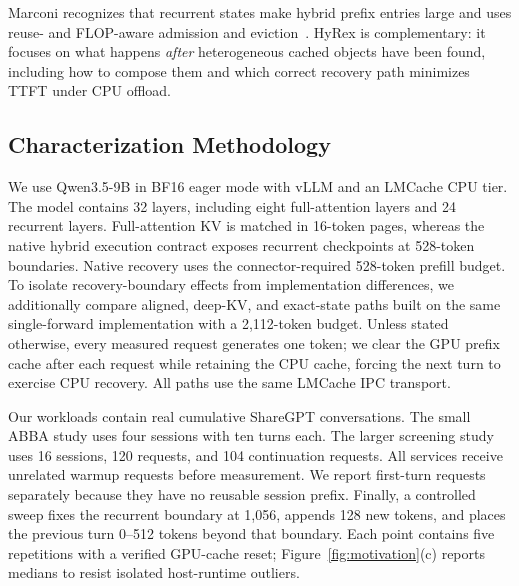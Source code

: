 \documentclass[sigconf,anonymous,review]{acmart}
\begin{document}
Marconi recognizes that recurrent states make hybrid prefix entries large and
uses reuse- and FLOP-aware admission and eviction~\cite{pan2025marconi}.  HyRex
is complementary: it focuses on what happens \emph{after} heterogeneous cached
objects have been found, including how to compose them and which correct
recovery path minimizes TTFT under CPU offload.

\subsection{Characterization Methodology}

We use Qwen3.5-9B in BF16 eager mode with vLLM and an LMCache CPU tier.  The
model contains 32 layers, including eight full-attention layers and 24 recurrent
layers.  Full-attention KV is matched in 16-token pages, whereas the native
hybrid execution contract exposes recurrent checkpoints at 528-token
boundaries.  Native recovery uses the connector-required 528-token prefill
budget.  To isolate recovery-boundary effects from implementation differences,
we additionally compare aligned, deep-KV, and exact-state paths built on the
same single-forward implementation with a 2,112-token budget.  Unless stated
otherwise, every measured request generates one token; we clear the GPU prefix
cache after each request while retaining the CPU cache, forcing the next turn
to exercise CPU recovery.  All paths use the same LMCache IPC transport.

Our workloads contain real cumulative ShareGPT conversations.  The small ABBA
study uses four sessions with ten turns each.  The larger screening study uses
16 sessions, 120 requests, and 104 continuation requests.  All services receive
unrelated warmup requests before measurement.  We report first-turn requests
separately because they have no reusable session prefix.  Finally, a controlled
sweep fixes the recurrent boundary at 1,056, appends 128 new tokens, and places
the previous turn 0--512 tokens beyond that boundary.  Each point contains five
repetitions with a verified GPU-cache reset; Figure~\ref{fig:motivation}(c)
reports medians to resist isolated host-runtime outliers.
\end{document}
